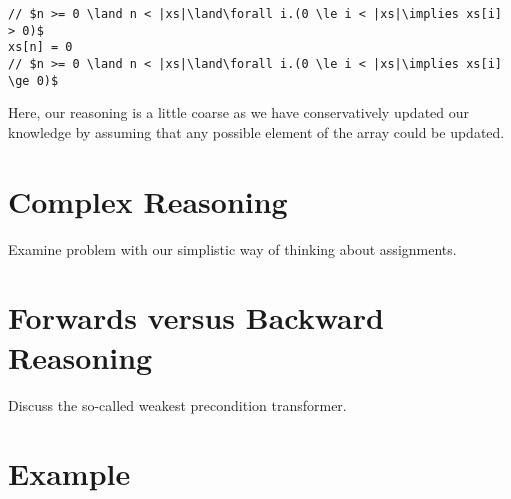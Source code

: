 \begin{lstlisting}
// $n >= 0 \land n < |xs|\land\forall i.(0 \le i < |xs|\implies xs[i] > 0)$
xs[n] = 0
// $n >= 0 \land n < |xs|\land\forall i.(0 \le i < |xs|\implies xs[i] \ge 0)$
\end{lstlisting}

Here, our reasoning is a little coarse as we have conservatively updated our knowledge by assuming that any possible element of the array could be updated.

\section{Complex Reasoning}
Examine problem with our simplistic way of thinking about assignments.  

\section{Forwards versus Backward Reasoning}
Discuss the so-called weakest precondition transformer.

\section{Example}

